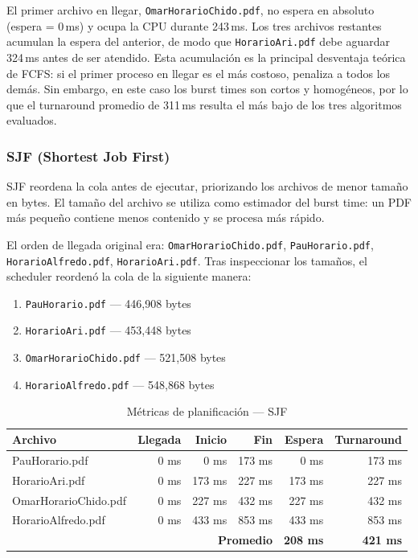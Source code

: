 El primer archivo en llegar, \texttt{OmarHorarioChido.pdf}, no espera en absoluto
(espera = 0\,ms) y ocupa la CPU durante 243\,ms. Los tres archivos restantes
acumulan la espera del anterior, de modo que \texttt{HorarioAri.pdf} debe aguardar
324\,ms antes de ser atendido. Esta acumulación es la principal desventaja teórica
de FCFS: si el primer proceso en llegar es el más costoso, penaliza a todos los demás.
Sin embargo, en este caso los burst times son cortos y homogéneos, por lo que el
turnaround promedio de 311\,ms resulta el más bajo de los tres algoritmos evaluados.

\subsubsection{SJF (Shortest Job First)}

SJF reordena la cola antes de ejecutar, priorizando los archivos de menor tamaño
en bytes. El tamaño del archivo se utiliza como estimador del burst time: un PDF
más pequeño contiene menos contenido y se procesa más rápido.

El orden de llegada original era: \texttt{OmarHorarioChido.pdf},
\texttt{PauHorario.pdf}, \texttt{HorarioAlfredo.pdf}, \texttt{HorarioAri.pdf}.
Tras inspeccionar los tamaños, el scheduler reordenó la cola de la siguiente manera:

\begin{enumerate}
    \item \texttt{PauHorario.pdf} — 446{,}908 bytes
    \item \texttt{HorarioAri.pdf} — 453{,}448 bytes
    \item \texttt{OmarHorarioChido.pdf} — 521{,}508 bytes
    \item \texttt{HorarioAlfredo.pdf} — 548{,}868 bytes
\end{enumerate}

\begin{table}[H]
\centering
\caption{Métricas de planificación — SJF}
\label{tab:sjf-metricas}
\begin{tabular}{|l|r|r|r|r|r|}
\hline
\textbf{Archivo} & \textbf{Llegada} & \textbf{Inicio} & \textbf{Fin} & \textbf{Espera} & \textbf{Turnaround} \\
\hline
PauHorario.pdf       &   0 ms &   0 ms & 173 ms &   0 ms & 173 ms \\
HorarioAri.pdf       &   0 ms & 173 ms & 227 ms & 173 ms & 227 ms \\
OmarHorarioChido.pdf &   0 ms & 227 ms & 432 ms & 227 ms & 432 ms \\
HorarioAlfredo.pdf   &   0 ms & 433 ms & 853 ms & 433 ms & 853 ms \\
\hline
\multicolumn{4}{|r|}{\textbf{Promedio}} & \textbf{208 ms} & \textbf{421 ms} \\
\hline
\end{tabular}
\end{table}

